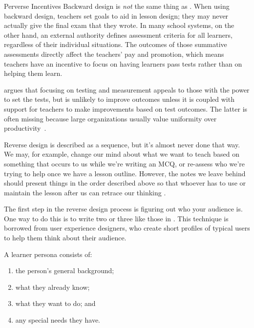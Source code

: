 \begin{aside}{Perverse Incentives}
  Backward design is \emph{not} the same thing as .
  When using backward design,
  teachers set goals to aid in lesson design;
  they may never actually give the final exam that they wrote.
  In many school systems,
  on the other hand,
  an external authority defines assessment criteria for all learners,
  regardless of their individual situations.
  The outcomes of those summative assessments directly affect the teachers' pay and promotion,
  which means teachers have an incentive to focus on having learners pass tests
  rather than on helping them learn.

  \cite{Gree2014} argues that focusing on testing and measurement
  appeals to those with the power to set the tests,
  but is unlikely to improve outcomes
  unless it is coupled with support for teachers to make improvements based on test outcomes.
  The latter is often missing because
  large organizations usually value uniformity over productivity~\cite{Scot1998}.
\end{aside}

Reverse design is described as a sequence,
but it's almost never done that way.
We may,
for example, change our mind about what we want to teach
based on something that occurs to us while we're writing an MCQ,
or re-assess who we're trying to help once we have a lesson outline.
However,
the notes we leave behind should present things in the order described above
so that whoever has to use or maintain the lesson after us can retrace our thinking
\cite{Parn1986}.


The first step in the reverse design process is figuring out who your audience is.
One way to do this is to write two or three
like those in .
This technique is borrowed from user experience designers,
who create short profiles of typical users
to help them think about their audience.

A learner persona consists of:

\begin{enumerate}

\item
  the person's general background;

\item
  what they already know;

\item
  what they want to do;
  and

\item
  any special needs they have.

\end{enumerate}

